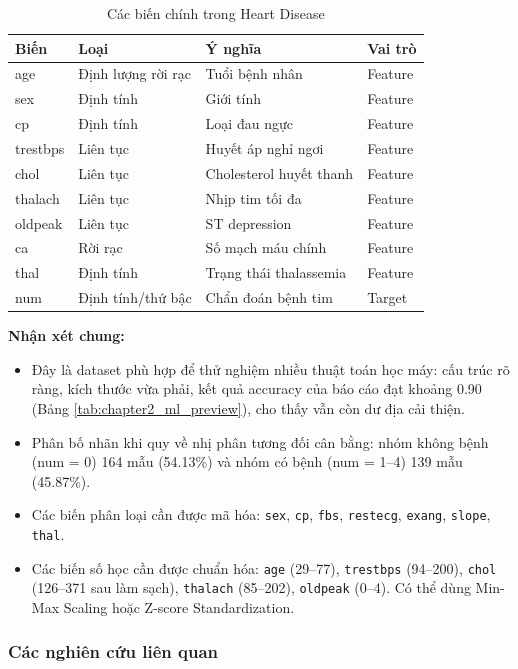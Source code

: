 \begin{table}[H]
\centering
\caption{Các biến chính trong Heart Disease}
\label{tab:heart_feature_dictionary}
\small
\begin{tabular}{llll}
\toprule
Biến & Loại & Ý nghĩa & Vai trò \\
\midrule
age & Định lượng rời rạc & Tuổi bệnh nhân & Feature \\
sex & Định tính & Giới tính & Feature \\
cp & Định tính & Loại đau ngực & Feature \\
trestbps & Liên tục & Huyết áp nghỉ ngơi & Feature \\
chol & Liên tục & Cholesterol huyết thanh & Feature \\
thalach & Liên tục & Nhịp tim tối đa & Feature \\
oldpeak & Liên tục & ST depression & Feature \\
ca & Rời rạc & Số mạch máu chính & Feature \\
thal & Định tính & Trạng thái thalassemia & Feature \\
num & Định tính/thứ bậc & Chẩn đoán bệnh tim & Target \\
\bottomrule
\end{tabular}
\end{table}

\textbf{Nhận xét chung:}
\begin{itemize}
 \item Đây là dataset phù hợp để thử nghiệm nhiều thuật toán học máy: cấu trúc rõ ràng, kích thước vừa phải, kết quả accuracy của báo cáo đạt khoảng 0.90 (Bảng \ref{tab:chapter2_ml_preview}), cho thấy vẫn còn dư địa cải thiện.
 \item Phân bố nhãn khi quy về nhị phân tương đối cân bằng: nhóm không bệnh (num = 0) 164 mẫu (54.13\%) và nhóm có bệnh (num = 1--4) 139 mẫu (45.87\%).
 \item Các biến phân loại cần được mã hóa: \texttt{sex}, \texttt{cp}, \texttt{fbs}, \texttt{restecg}, \texttt{exang}, \texttt{slope}, \texttt{thal}.
 \item Các biến số học cần được chuẩn hóa: \texttt{age} (29--77), \texttt{trestbps} (94--200), \texttt{chol} (126--371 sau làm sạch), \texttt{thalach} (85--202), \texttt{oldpeak} (0--4). Có thể dùng Min-Max Scaling hoặc Z-score Standardization.
\end{itemize}

\subsubsection{Các nghiên cứu liên quan}


